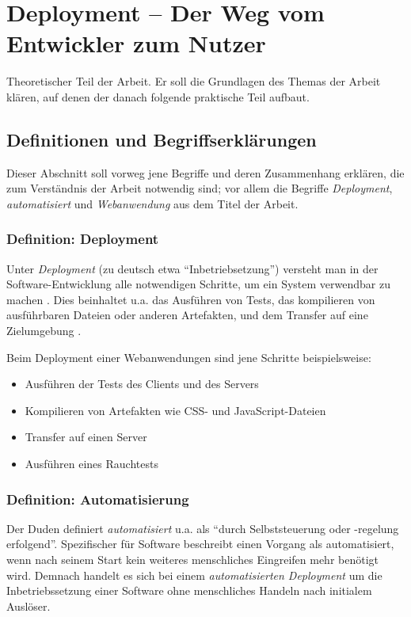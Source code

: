 \chapter{Deployment – Der Weg vom Entwickler zum Nutzer}

Theoretischer Teil der Arbeit. Er soll die Grundlagen des Themas der Arbeit klären, auf denen der danach folgende praktische Teil aufbaut.


\section{Definitionen und Begriffserklärungen}

Dieser Abschnitt soll vorweg jene Begriffe und deren Zusammenhang erklären, die zum Verständnis der Arbeit notwendig sind; vor allem die Begriffe \emph{Deployment}, \emph{automatisiert} und \emph{Webanwendung} aus dem Titel der Arbeit.

\subsection{Definition: Deployment}

Unter \emph{Deployment} (zu deutsch etwa ``Inbetriebsetzung'') versteht man in der Software-Entwicklung alle notwendigen Schritte, um ein System verwendbar zu machen \citep[21]{Breuer2009}. Dies beinhaltet u.a. das Ausführen von Tests, das kompilieren von ausführbaren Dateien oder anderen Artefakten, und dem Transfer auf eine Zielumgebung \citep[4]{Humble2010}.

Beim Deployment einer Webanwendungen sind jene Schritte beispielsweise:

\begin{itemize}
  \item Ausführen der Tests des Clients und des Servers
  \item Kompilieren von Artefakten wie CSS- und JavaScript-Dateien
  \item Transfer auf einen Server
  \item Ausführen eines Rauchtests
\end{itemize}

\subsection{Definition: Automatisierung}

Der Duden \citeyearpar{Duden} definiert \emph{automatisiert} u.a. als ``durch Selbststeuerung oder -regelung erfolgend''. Spezifischer für Software beschreibt \citet[27]{Duvall2007} einen Vorgang als automatisiert, wenn nach seinem Start kein weiteres menschliches Eingreifen mehr benötigt wird. Demnach handelt es sich bei einem \emph{automatisierten Deployment} um die Inbetriebssetzung einer Software ohne menschliches Handeln nach initialem Auslöser.

